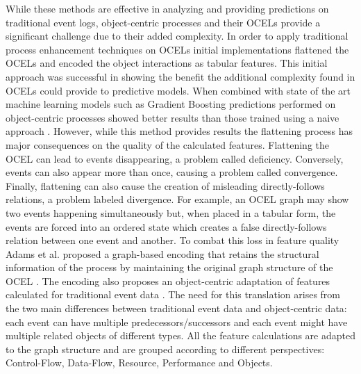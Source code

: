         While these methods are effective in analyzing and providing predictions on traditional event logs, object-centric processes and their OCELs provide a significant challenge due to their added complexity. 
        In order to apply traditional process enhancement techniques on OCELs initial implementations flattened the OCELs and encoded the object interactions as tabular features. 
        This initial approach was successful in showing the benefit the additional complexity found in OCELs could provide to predictive models. When combined with state of the art machine learning models such as Gradient Boosting predictions performed on object-centric processes showed better results than those trained using a naive approach \cite{galanti2023a}.
        However, while this method provides results the flattening process has major consequences on the quality of the calculated features. Flattening the OCEL can lead to events disappearing, a problem called deficiency. Conversely, events can also appear more than once, causing a problem called convergence. Finally, flattening can also cause the creation of misleading directly-follows relations, a problem labeled divergence. For example, an OCEL graph may show two events happening simultaneously but, when placed in a tabular form, the events are forced into an ordered state which creates a false directly-follows relation between one event and another.
        To combat this loss in feature quality Adams et al. proposed a graph-based encoding that retains the structural information of the process by maintaining the original graph structure of the OCEL \cite{adams2022}. The encoding also proposes an object-centric adaptation of features calculated for traditional event data \cite{deleoni2016}. The need for this translation arises from the two main differences between traditional event data and object-centric data: each event can have multiple predecessors/successors and each event might have multiple related objects of different types. All the feature calculations are adapted to the graph structure and are grouped according to different perspectives: Control-Flow, Data-Flow, Resource, Performance and Objects.


